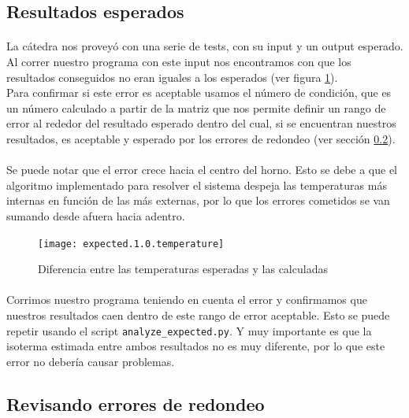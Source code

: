 \documentclass[12pt]{article}
\begin{document}
\subsection{Resultados esperados}
\label{sec:expected}

\paragraph{} La cátedra nos proveyó con una serie de tests, con su input y un output esperado. Al correr nuestro programa con este input nos encontramos con que los resultados conseguidos no eran iguales a los esperados (ver figura \ref{fig:expected.diffs}). \\
Para confirmar si este error es aceptable usamos el número de condición, que es un número calculado a partir de la matriz que nos permite definir un rango de error al rededor del resultado esperado dentro del cual, si se encuentran nuestros resultados, es aceptable y esperado por los errores de redondeo (ver sección \ref{sec:rounding}).

\paragraph{} Se puede notar que el error crece hacia el centro del horno. Esto se debe a que el algoritmo implementado para resolver el sistema despeja las temperaturas más internas en función de las más externas, por lo que los errores cometidos se van sumando desde afuera hacia adentro.

\begin{figure}[H]
\centering
\texttt{[image: expected.1.0.temperature]}
\caption{Diferencia entre las temperaturas esperadas y las calculadas}
\label{fig:expected.diffs}
\end{figure}

\paragraph{} Corrimos nuestro programa teniendo en cuenta el error y confirmamos que nuestros resultados caen dentro de este rango de error aceptable. Esto se puede repetir usando el script \texttt{analyze\_expected.py}. Y muy importante es que la isoterma estimada entre ambos resultados no es muy diferente, por lo que este error no debería causar problemas. %

\subsection{Revisando errores de redondeo}
\label{sec:rounding}
\end{document}
